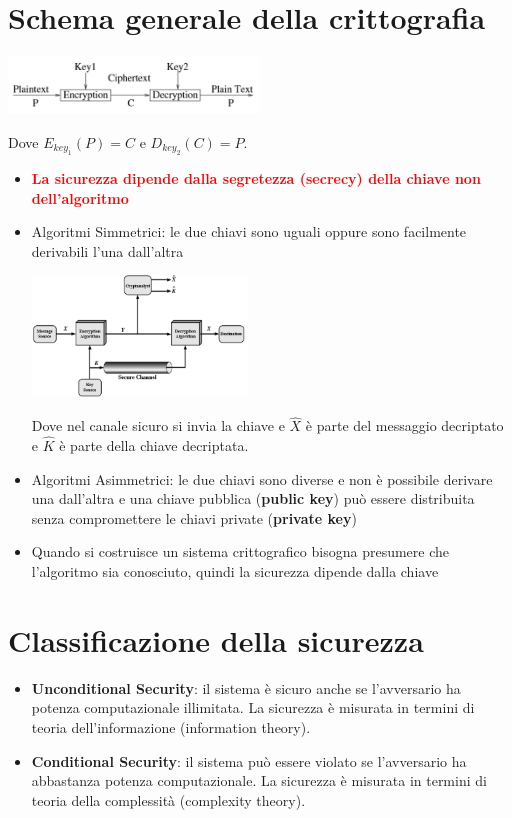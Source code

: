 \documentclass[12pt, a4paper]{report}
\begin{document}
\section{Schema generale della crittografia}
\begin{center}
    \includegraphics[width=0.5\textwidth]{Immagini/schemacrittografia.png}
\end{center}
Dove $E_{key_{1}}(P)= C$ e $D_{key_{2}}(C) = P$.
\begin{itemize}
    \item \textbf{\textcolor{red}{La sicurezza dipende dalla segretezza (secrecy) della chiave non dell'algoritmo}}
    \item Algoritmi Simmetrici: le due chiavi sono uguali oppure sono facilmente derivabili l'una dall'altra \begin{center}
        \includegraphics[width=0.45\textwidth]{Immagini/chiavesimmetrica.png}
    \end{center}
    Dove nel canale sicuro si invia la chiave e $\hat{X}$ è parte del messaggio decriptato e $\hat{K}$ è parte della chiave decriptata.
    \item Algoritmi Asimmetrici: le due chiavi sono diverse e non è possibile derivare una dall'altra e una chiave pubblica (\textbf{public key}) può essere distribuita senza compromettere le chiavi private (\textbf{private key})
    \item Quando si costruisce un sistema crittografico bisogna presumere che l'algoritmo sia conosciuto, quindi la sicurezza dipende dalla chiave
\end{itemize}
\section{Classificazione della sicurezza}
\begin{itemize}
    \item \textbf{Unconditional Security}: il sistema è sicuro anche se l'avversario ha potenza computazionale illimitata. La sicurezza è misurata in termini di teoria dell'informazione (information theory).
    \item \textbf{Conditional Security}: il sistema può essere violato se l'avversario ha abbastanza potenza computazionale. La sicurezza è misurata in termini di teoria della complessità (complexity theory).
\end{itemize}
\end{document}
